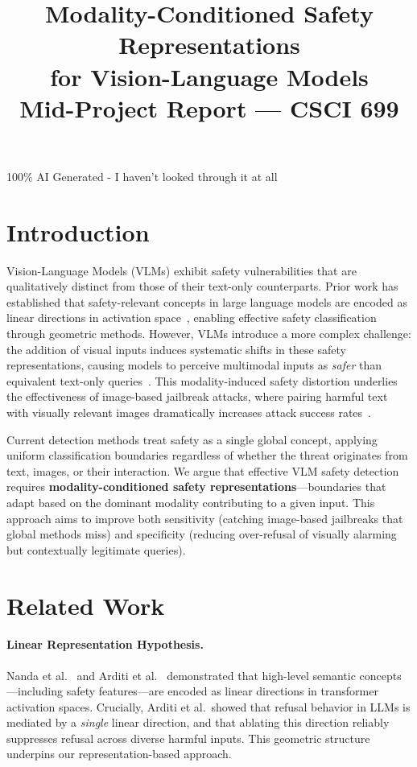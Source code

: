 \documentclass{article}
\title{Modality-Conditioned Safety Representations\\
       for Vision-Language Models\\[4pt]
       \large Mid-Project Report --- CSCI 699}
\author{%
  
}
\begin{document}
\maketitle

100\% AI Generated - I haven’t looked through it at all

\section{Introduction}

Vision-Language Models (VLMs) exhibit safety vulnerabilities that are qualitatively distinct from
those of their text-only counterparts. Prior work has established that safety-relevant concepts in
large language models are encoded as linear directions in activation space~\cite{nanda2023emergent,
arditi2024refusal}, enabling effective safety classification through geometric methods. However,
VLMs introduce a more complex challenge: the addition of visual inputs induces systematic shifts in
these safety representations, causing models to perceive multimodal inputs as \emph{safer} than
equivalent text-only queries~\cite{zou2025shiftdc}. This modality-induced safety distortion
underlies the effectiveness of image-based jailbreak attacks, where pairing harmful text with
visually relevant images dramatically increases attack success rates~\cite{liu2024mmsafetybench,
luo2024jailbreakv}.

Current detection methods treat safety as a single global concept, applying uniform classification
boundaries regardless of whether the threat originates from text, images, or their interaction. We
argue that effective VLM safety detection requires \textbf{modality-conditioned safety
representations}---boundaries that adapt based on the dominant modality contributing to a given
input. This approach aims to improve both sensitivity (catching image-based jailbreaks that global
methods miss) and specificity (reducing over-refusal of visually alarming but contextually
legitimate queries).

\section{Related Work}

\paragraph{Linear Representation Hypothesis.}
Nanda et al.~\cite{nanda2023emergent} and Arditi et al.~\cite{arditi2024refusal} demonstrated that
high-level semantic concepts---including safety features---are encoded as linear directions in
transformer activation spaces. Crucially, Arditi et al.\ showed that refusal behavior in LLMs is
mediated by a \emph{single} linear direction, and that ablating this direction reliably suppresses
refusal across diverse harmful inputs. This geometric structure underpins our representation-based
approach.
\end{document}
